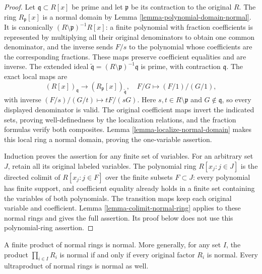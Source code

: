 \begin{proof}
Let $\mathfrak q\subset R[x]$ be prime and let
$\mathfrak p$ be its contraction to the original $R$.
The ring $R_{\mathfrak p}[x]$ is a normal domain by
Lemma \ref{lemma-polynomial-domain-normal}. It is canonically
$(R\setminus\mathfrak p)^{-1}R[x]$: a finite polynomial with
fraction coefficients is represented by multiplying all their
original denominators to obtain one common denominator, and
the inverse sends $F/s$ to the polynomial whose coefficients
are the corresponding fractions. These maps preserve coefficient
equalities and are inverse. The extended ideal
$\widetilde{\mathfrak q}=(R\setminus\mathfrak p)^{-1}\mathfrak q$
is prime, with contraction $\mathfrak q$. The exact local maps are
$$
(R[x])_{\mathfrak q}\longrightarrow
(R_{\mathfrak p}[x])_{\widetilde{\mathfrak q}},
\quad F/G\longmapsto(F/1)/(G/1),
$$
with inverse $(F/s)/(G/t)\mapsto tF/(sG)$.
Here $s,t\in R\setminus\mathfrak p$ and $G\notin\mathfrak q$,
so every displayed denominator is valid. The original coefficient
maps invert the indicated sets, proving well-definedness by the
localization relations, and the fraction formulas verify both
composites. Lemma \ref{lemma-localize-normal-domain} makes this
local ring a normal domain, proving the one-variable assertion.

Induction proves the assertion for any finite set of variables.
For an arbitrary set $J$, retain all its original labeled variables.
The polynomial ring $R[x_j:j\in J]$ is the directed colimit of
$R[x_j:j\in F]$ over the finite subsets $F\subset J$:
every polynomial has finite support, and coefficient equality
already holds in a finite set containing the variables of both
polynomials. The transition maps keep each original variable and
coefficient. Lemma \ref{lemma-colimit-normal-ring} applies to
these normal rings and gives the full assertion. Its proof below
does not use this polynomial-ring assertion.
\end{proof}

\begin{lemma}
\label{lemma-finite-product-normal}
A finite product of normal rings is normal. More generally,
for any set $I$, the product $\prod_{i\in I}R_i$ is normal
if and only if every original factor $R_i$ is normal.
Every ultraproduct of normal rings is normal as well.
\end{lemma}

